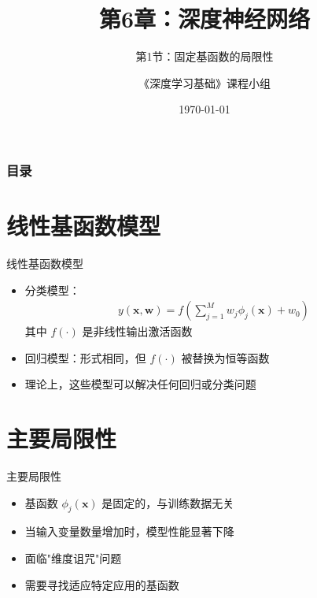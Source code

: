 \documentclass[t,aspectratio=169]{beamer} %
\title[6.1.固定基函数的局限性]{第6章：深度神经网络}
\subtitle{第1节：固定基函数的局限性}
\author{《深度学习基础》课程小组}
\date{\today}
\begin{document}
\frame{\maketitle}

\begin{frame}
    \frametitle{目录}
    \tableofcontents
\end{frame}

\section{线性基函数模型}
\begin{frame}{线性基函数模型}
\begin{itemize}
    \item 分类模型：
    \begin{align*}
        y(\mathbf{x}, \mathbf{w}) = f\left( \sum_{j=1}^{M} w_j \phi_j(\mathbf{x}) + w_0 \right)
    \end{align*}
    其中 $f(\cdot)$ 是非线性输出激活函数
    
    \item 回归模型：形式相同，但 $f(\cdot)$ 被替换为恒等函数
    
    \item 理论上，这些模型可以解决任何回归或分类问题
\end{itemize}
\end{frame}

\section{主要局限性}
\begin{frame}{主要局限性}
\begin{itemize}
    \item 基函数 $\phi_j(\mathbf{x})$ 是固定的，与训练数据无关
    \item 当输入变量数量增加时，模型性能显著下降
    \item 面临"维度诅咒"问题
    \item 需要寻找适应特定应用的基函数
\end{itemize}
\end{frame}

\end{document}
